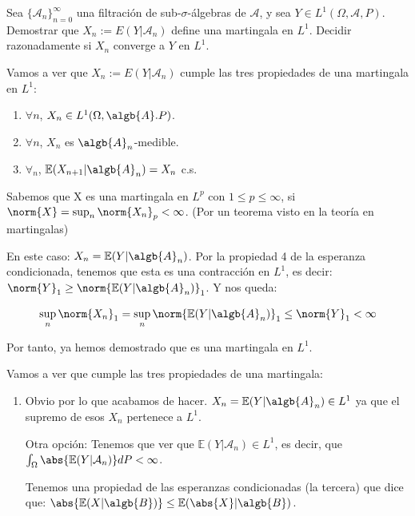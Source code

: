 \begin{problem}[1] Sea $\{\mathcal{A}_n\}_{n=0}^{\infty}$ una filtraci\'on de sub-$\sigma$-\'algebras de $\mathcal{A}$,
y sea $Y\in L^1(\Omega, \mathcal{A}, P)$. Demostrar que $X_n:=  E(Y|\mathcal{A}_n)$ define una
martingala en $L^1$. Decidir razonadamente si $X_n$ converge a $Y$ en $L^1$.

\solution

\begin{expla}
Vamos a ver que $X_n:=  E(Y|\mathcal{A}_n)$ cumple las tres propiedades de una martingala en $L^1$:
\begin{enumerate}
\item $\forall n$, $X_n \in L^1(\Omega, \algb{A}. P)$.
\item $\forall n$, $X_n$ es $\algb{A}_n$-medible.
\item $\forall_n$, $\mathbb{E}(X_{n+1}|\algb{A}_n)=X_n$ c.s.

\end{enumerate}

\end{expla}
Sabemos que X es una martingala en $L^p$ con $1\leq p \leq \infty$, si $\norm{X} = \sup_{n}\norm{X_n}_p < \infty$. (Por un teorema visto en la teoría en martingalas)

En este caso: $X_n = \mathbb{E}(Y|\algb{A}_n)$. Por la propiedad 4 de la esperanza condicionada, tenemos que esta es una contracción en $L^1$, es decir: $\norm{Y}_1 \geq \norm{\mathbb{E}(Y|\algb{A}_n)}_1$. Y nos queda:

\[
\sup_{n}\norm{X_n}_1 = \sup_{n}\norm{\mathbb{E}(Y|\algb{A}_n)}_1 \leq \norm{Y}_1 < \infty
\]

Por tanto, ya hemos demostrado que es una martingala en $L^1$.

Vamos a ver que cumple las tres propiedades de una martingala:

\begin{enumerate}
\item Obvio por lo que acabamos de hacer. $X_n = \mathbb{E}(Y |\algb{A}_n) \in L^1$ ya que el supremo de esos $X_n$ pertenece a $L^1$.

Otra opción:
Tenemos que ver que $\mathbb{E}(Y|\mathcal{A}_n) \in L^1$, es decir, que $\int_{\Omega} \abs{\mathbb{E}(Y|\mathcal{A}_n)} dP < \infty$. 

Tenemos una propiedad de las esperanzas condicionadas (la tercera) que dice que: $\abs{\mathbb{E}(X|\algb{B})} \leq \mathbb{E}(\abs{X}|\algb{B})$.


\end{enumerate}
\end{problem}
